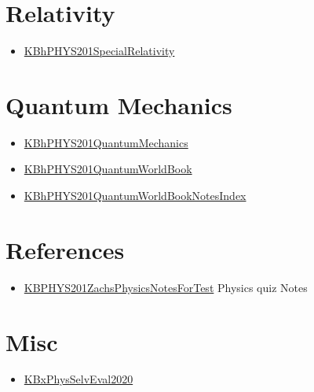 \documentclass[letterpaper]{article}
\begin{document}
\section{Relativity}
\label{sec:org82b5861}
\begin{itemize}
\item \href{KBhPHYS201SpecialRelativity.org}{KBhPHYS201SpecialRelativity}
\end{itemize}

\section{Quantum Mechanics}
\label{sec:orgcb06ee2}
\begin{itemize}
\item \href{KBhPHYS201QuantumMechanics.org}{KBhPHYS201QuantumMechanics}
\item \href{KBhPHYS201QuantumWorldBook.org}{KBhPHYS201QuantumWorldBook}
\item \href{KBhPHYS201QuantumWorldBookNotesIndex.org}{KBhPHYS201QuantumWorldBookNotesIndex}
\end{itemize}

\section{References}
\label{sec:org7fd7e66}
\begin{itemize}
\item \href{KBPHYS201ZachsPhysicsNotesForTest.org}{KBPHYS201ZachsPhysicsNotesForTest}
Physics quiz Notes
\end{itemize}

\section{Misc}
\label{sec:org8a12279}
\begin{itemize}
\item \href{KBxPhysSelvEval2020.org}{KBxPhysSelvEval2020}
\end{itemize}
\end{document}
